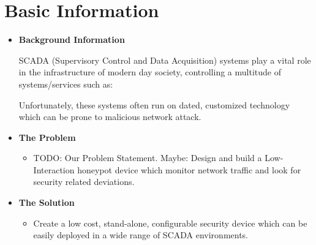 
\section*{\color{NavyBlue}Basic Information}
\begin{itemize}
\item\Large{\color{Blue}\textbf{Background Information}}
	\begin{itemize}
	\centering\large{SCADA (Supervisory Control and Data Acquisition) systems play a vital role in the infrastructure of modern day society, controlling a multitude of systems/services such as:}
		\begin{itemize}
		\setlength{\columnsep}{-5cm}
		\def\columnseprulecolor{\color{white}}
		\begin{centering}
		\end{centering}
		\end{itemize}
	\large{Unfortunately, these systems often run on dated, customized technology which can be prone to malicious network attack.}
	\end{itemize}
\item\Large{\color{Blue}\textbf{The Problem}}
	\begin{itemize}
	\item\large{TODO: Our Problem Statement. Maybe: Design and build a Low-Interaction honeypot device which monitor network traffic and look for security related deviations.}
	\end{itemize}
\item\Large{\color{Blue}\textbf{The Solution}}
	\begin{itemize}
	\item\large{Create a low cost, stand-alone, configurable security device which can be easily deployed in a wide range of SCADA environments.}
	\end{itemize}
\end{itemize}


